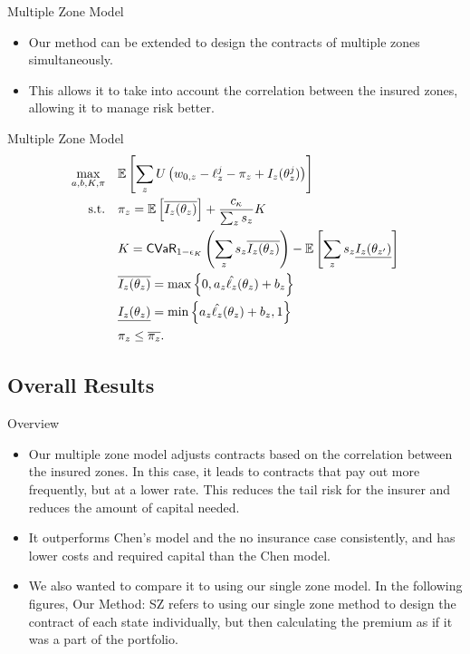 \documentclass{beamer}
\begin{document}
\begin{frame}{Multiple Zone Model}
\begin{itemize}
    \setlength\itemsep{2em}
    \item Our method can be extended to design the contracts of multiple zones simultaneously. 
    \item This allows it to take into account the correlation between the insured zones, allowing it to manage risk better. 
\end{itemize}
\end{frame}

\begin{frame}{Multiple Zone Model}
    \begin{align}
        \max_{a,b,K,\pi} &\quad \mathbb{E}\left [ \sum_z U\left ( w_{0,z} -\ell_z^j -\pi_z + I_z(\theta^j_z) \right ) \right ]\label{eq-33}\\
        \text{s.t.} &\quad \pi_z  = \mathbb{E}\left [ \overline{I_z(\theta_z)} \right ] + \frac{c_{\kappa}}{\sum_z s_z}  K\\
        &\quad K = {\sf CVaR}_{1-\epsilon_K} \left ( \sum_z s_z\overline{I_z(\theta_z)} \right ) - \mathbb{E}\left [ \sum_{z} s_{z}\underline{I_{z}(\theta_{z'})} \right ] \label{eq-32}\\
        &\quad \overline{I_z(\theta_z)} = \max \left \{0,a_z\hat{\ell_z}(\theta_z) + b_z \right \} \nonumber\\
        &\quad\underline{I_z(\theta_z)} = \min \left \{a_z\hat{\ell_z}(\theta_z)+b_z,1 \right \} \nonumber\\
        &\quad\pi_z \leq \overline{\pi_z} \nonumber.
      \end{align}
\end{frame}

\subsection{Overall Results}
\begin{frame}{Overview}
    \begin{itemize}
        \item Our multiple zone model adjusts contracts based on the correlation between the insured zones. In this case, it leads to contracts that pay out more frequently, but at a lower rate. This reduces the tail risk for the insurer and reduces the amount of capital needed. 
        \item It outperforms Chen's model and the no insurance case consistently, and has lower costs and required capital than the Chen model. 
        \item We also wanted to compare it to using our single zone model. In the following figures, Our Method: SZ refers to using our single zone method to design the contract of each state individually, but then calculating the premium as if it was a part of the portfolio. 
    \end{itemize}
\end{frame}
\end{document}
